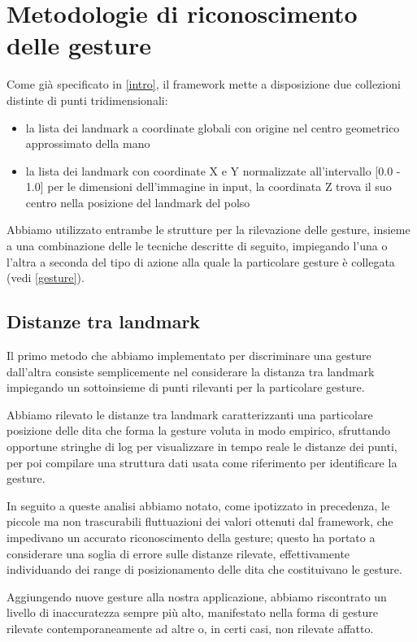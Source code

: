 \chapter{Metodologie di riconoscimento delle gesture}

Come già specificato in \ref{intro}, il framework mette a disposizione due collezioni distinte di punti tridimensionali: 
\begin{itemize}
    \item la lista dei landmark a coordinate globali con origine nel centro geometrico approssimato della mano
    \item la lista dei landmark con coordinate X e Y normalizzate all'intervallo [0.0 - 1.0] per le dimensioni dell'immagine in input, la coordinata Z trova il suo centro nella posizione del landmark del polso
\end{itemize}

\noindent Abbiamo utilizzato entrambe le strutture per la rilevazione delle gesture, insieme a una combinazione delle le tecniche descritte di seguito, impiegando l'una o l'altra a seconda del tipo di azione alla quale la particolare gesture è collegata (vedi \ref{gesture}).

\section{Distanze tra landmark}

Il primo metodo che abbiamo implementato per discriminare una gesture dall'altra consiste semplicemente nel considerare la distanza tra landmark impiegando un sottoinsieme di punti rilevanti per la particolare gesture.

Abbiamo rilevato le distanze tra landmark caratterizzanti una particolare posizione delle dita che forma la gesture voluta in modo empirico, sfruttando opportune stringhe di log per visualizzare in tempo reale le distanze dei punti, per poi compilare una struttura dati usata come riferimento per identificare la gesture.

In seguito a queste analisi abbiamo notato, come ipotizzato in precedenza, le piccole ma non trascurabili fluttuazioni dei valori ottenuti dal framework, che impedivano un accurato riconoscimento della gesture; questo ha portato a considerare una soglia di errore sulle distanze rilevate, effettivamente individuando dei range di posizionamento delle dita che costituivano le gesture.

Aggiungendo nuove gesture alla nostra applicazione, abbiamo riscontrato un livello di inaccuratezza sempre più alto, manifestato nella forma di gesture rilevate contemporaneamente ad altre o, in certi casi, non rilevate affatto.

